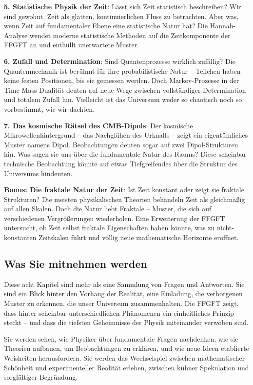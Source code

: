 \documentclass[11pt,openright,twoside]{book}
\begin{document}
\textbf{5. Statistische Physik der Zeit}: Lässt sich Zeit statistisch beschreiben? Wir sind gewohnt, Zeit als glatten, kontinuierlichen Fluss zu betrachten. Aber was, wenn Zeit auf fundamentaler Ebene eine statistische Natur hat? Die Hannah-Analyse wendet moderne statistische Methoden auf die Zeitkomponente der FFGFT an und enthüllt unerwartete Muster.

\textbf{6. Zufall und Determination}: Sind Quantenprozesse wirklich zufällig? Die Quantenmechanik ist berühmt für ihre probabilistische Natur – Teilchen haben keine festen Positionen, bis sie gemessen werden. Doch Markov-Prozesse in der Time-Mass-Dualität deuten auf neue Wege zwischen vollständiger Determination und totalem Zufall hin. Vielleicht ist das Universum weder so chaotisch noch so vorbestimmt, wie wir dachten.

\textbf{7. Das kosmische Rätsel des CMB-Dipols}: Der kosmische Mikrowellenhintergrund – das Nachglühen des Urknalls – zeigt ein eigentümliches Muster namens Dipol. Beobachtungen deuten sogar auf zwei Dipol-Strukturen hin. Was sagen sie uns über die fundamentale Natur des Raums? Diese scheinbar technische Beobachtung könnte auf etwas Tiefgreifendes über die Struktur des Universums hindeuten.

\textbf{Bonus: Die fraktale Natur der Zeit}: Ist Zeit konstant oder zeigt sie fraktale Strukturen? Die meisten physikalischen Theorien behandeln Zeit als gleichmäßig auf allen Skalen. Doch die Natur liebt Fraktale – Muster, die sich auf verschiedenen Vergrößerungen wiederholen. Eine Erweiterung der FFGFT untersucht, ob Zeit selbst fraktale Eigenschaften haben könnte, was zu nicht-konstanten Zeitskalen führt und völlig neue mathematische Horizonte eröffnet.

\subsection*{Was Sie mitnehmen werden}

Diese acht Kapitel sind mehr als eine Sammlung von Fragen und Antworten. Sie sind ein Blick hinter den Vorhang der Realität, eine Einladung, die verborgenen Muster zu erkennen, die unser Universum zusammenhalten. Die FFGFT zeigt, dass hinter scheinbar unterschiedlichen Phänomenen ein einheitliches Prinzip steckt – und dass die tiefsten Geheimnisse der Physik miteinander verwoben sind.

Sie werden sehen, wie Physiker über fundamentale Fragen nachdenken, wie sie Theorien aufbauen, um Beobachtungen zu erklären, und wie neue Ideen etablierte Weisheiten herausfordern. Sie werden das Wechselspiel zwischen mathematischer Schönheit und experimenteller Realität erleben, zwischen kühner Spekulation und sorgfältiger Begründung.
\end{document}
